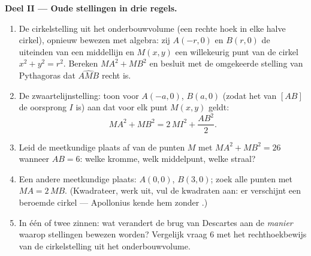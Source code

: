\begin{problem}
\medskip
\noindent\textbf{Deel II --- Oude stellingen in drie regels.}
\begin{enumerate}[resume]
  \item De cirkelstelling uit het onderbouwvolume (een rechte hoek in elke
        halve cirkel), opnieuw bewezen met algebra: zij $A(-r, 0)$ en
        $B(r, 0)$ de uiteinden van een middellijn en $M(x, y)$ een
        willekeurig punt van de cirkel $x^2 + y^2 = r^2$. Bereken
        $MA^2 + MB^2$ en besluit met de omgekeerde stelling van Pythagoras
        dat $\widehat{AMB}$ recht is.
  \item De zwaartelijnstelling: toon voor $A(-a, 0)$, $B(a, 0)$ (zodat het
         van $[AB]$ de oorsprong $I$ is) aan dat voor elk punt
        $M(x, y)$ geldt:
        \[
        MA^2 + MB^2 = 2\,MI^2 + \frac{AB^2}{2} .
        \]
  \item Leid de meetkundige plaats af van de punten $M$ met
        $MA^2 + MB^2 = 26$ wanneer $AB = 6$: welke kromme, welk middelpunt,
        welke straal?
  \item Een andere meetkundige plaats: $A(0,0)$, $B(3,0)$; zoek alle punten
        met $MA = 2\,MB$. (Kwadrateer, werk uit, vul de kwadraten aan: er
        verschijnt een beroemde cirkel --- Apollonius kende hem zonder
        .)
  \item In één of twee zinnen: wat verandert de brug van Descartes aan de
        \emph{manier} waarop stellingen bewezen worden? Vergelijk vraag 6 met
        het rechthoekbewijs van de cirkelstelling uit het onderbouwvolume.
\end{enumerate}


\end{problem}
